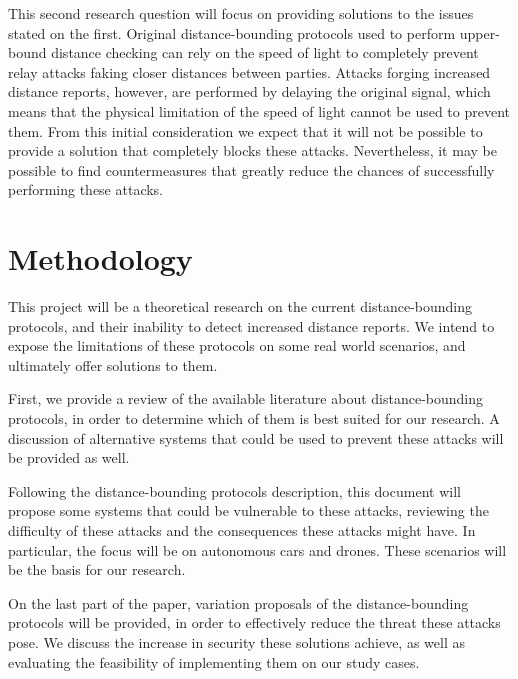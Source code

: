 \documentclass{article}
\begin{document}
This second research question will focus on providing solutions to the issues stated on the first. Original distance-bounding protocols used to perform upper-bound distance checking can rely on the speed of light to completely prevent relay attacks faking closer distances between parties. Attacks forging increased distance reports, however, are performed by delaying the original signal, which means that the physical limitation of the speed of light cannot be used to prevent them. From this initial consideration we expect that it will not be possible to provide a solution that completely blocks these attacks. Nevertheless, it may be possible to find countermeasures that greatly reduce the chances of successfully performing these attacks.








\section{Methodology}
\label{sec:methodology}

This project will be a theoretical research on the current distance-bounding protocols, and their inability to detect increased distance reports. We intend to expose the limitations of these protocols on some real world scenarios, and ultimately offer solutions to them.

First, we provide a review of the available literature about distance-bounding protocols, in order to determine which of them is best suited for our research. A discussion of alternative systems that could be used to prevent these attacks will be provided as well.

Following the distance-bounding protocols description, this document will propose some systems that could be vulnerable to these attacks, reviewing the difficulty of these attacks and the consequences these attacks might have. In particular, the focus will be on autonomous cars and drones. These scenarios will be the basis for our research.

On the last part of the paper, variation proposals of the distance-bounding protocols will be provided, in order to effectively reduce the threat these attacks pose. We discuss the increase in security these solutions achieve, as well as evaluating the feasibility of implementing them on our study cases.
\end{document}
